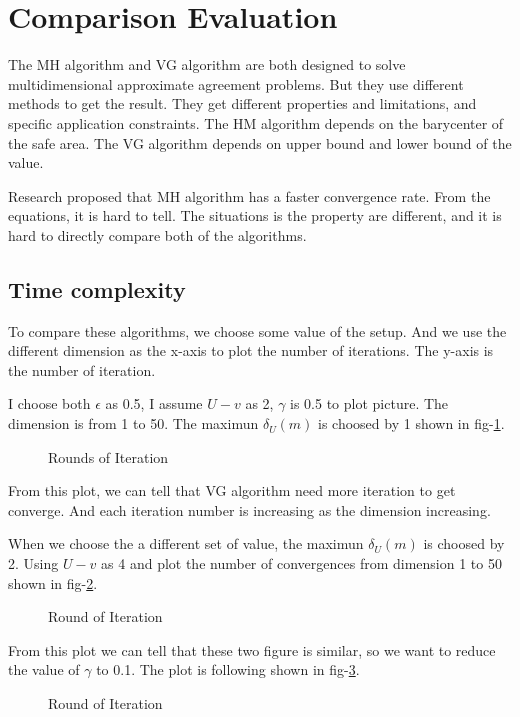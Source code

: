 \section{Comparison Evaluation}
The MH algorithm and VG algorithm are both designed to solve
multidimensional approximate agreement problems. But they use
different methods to get the result. They get different properties
and limitations, and specific application constraints. The HM
algorithm depends on the barycenter of the safe area. The VG
algorithm depends on upper bound and lower bound of the value.

Research proposed that MH algorithm has a faster convergence rate.
From the equations, it is hard to tell. The situations is the
property are different, and it is hard to directly compare both
of the algorithms. 

\subsection{Time complexity}
To compare these algorithms, we choose some value of the setup.
And we use the different dimension as the x-axis to plot the 
number of iterations. The y-axis is the number of iteration.

I choose both $\epsilon$ as 0.5, I assume
$U - v$ as 2, $\gamma$ is 0.5 to plot picture. The dimension is
from 1 to 50. The maximun $\delta_{U}(m)$ is choosed by 1 shown
in fig-\ref{fig:M1}.

\begin{figure}

\caption{Rounds of Iteration} \label{fig:M1}
\end{figure}

From this plot, we can tell that VG algorithm need more iteration
to get converge. And each iteration number is increasing as the 
dimension increasing.

When we choose the a different set of value, the maximun $\delta_{U}(m)$ is choosed by 2.
Using $U - v$ as 4 and plot the number of convergences from
dimension 1 to 50 shown in fig-\ref{fig:M2}.

\begin{figure}

\caption{Round of Iteration} \label{fig:M2}
\end{figure}

From this plot we can tell that these two figure is similar, so we 
want to reduce the value of $\gamma$ to 0.1. The plot is following shown
in fig-\ref{fig:M3}.

\begin{figure}

\caption{Round of Iteration} \label{fig:M3}
\end{figure}

